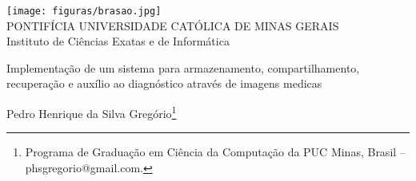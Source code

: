 \documentclass[a4paper,12pt,Times]{article}
\makeatletter
\newcommand{\monog}{Implementação de um sistema para armazenamento, compartilhamento, recuperação e auxílio ao diagnóstico através de imagens medicas}
\newcommand{\monogES}{}
\newcommand{\origem}{Brasil }
\newcommand{\AutorA}{Pedro Henrique da Silva Gregório}
\newcommand{\funcaoA}{}
\newcommand{\emailA}{phsgregorio@gmail.com}
\newcommand{\cursA}{Programa de Graduação em Ciência da Computação da PUC Minas}
\newcommand{\keyword}[1]{\textsf{#1}}
\makeatother
\begin{document}

\begin{center}
\texttt{[image: figuras/brasao.jpg]} \\
PONTIFÍCIA UNIVERSIDADE CATÓLICA DE MINAS GERAIS \\
Instituto de Ciências Exatas e de Informática


\end{center}

 \vspace{0cm} {
 \singlespacing \Large{\monog {} \\ }
  \normalsize{\monogES}
 }

\vspace{1.0cm}

\begin{flushright}
\singlespacing 
\normalsize{\AutorA \footnote{\funcaoA \cursA, \origem -- \emailA . }} \\
\end{flushright}
\thispagestyle{empty}

\vspace{1.0cm}

\begin{abstract}
\noindent

Este artigo tem como intuito apresentar um sistema para armazenamento, compartilhamento, recuperação e auxílio ao diagnóstico através de imagens médicas.
O projeto do sistema foi implementado baseado em uma plataforma que separa as operações em camadas.
Essa implementação tem como foco a extensibilidade e adaptatividade do sistema, tornando possível sua futura ampliação e aplicação na área diagnóstico médico.
A metodologia adotada gerencia o armazenamento e recuperação da imagem de forma organizada e flexível, além de oferecer um ambiente de fácil aprendizado para os desenvolvedores.
\\\textbf{\keyword{Palavras-chave: }} Telemedicina. PACS. IRMA. Imagem Médica.
\end{abstract}
\end{document}
